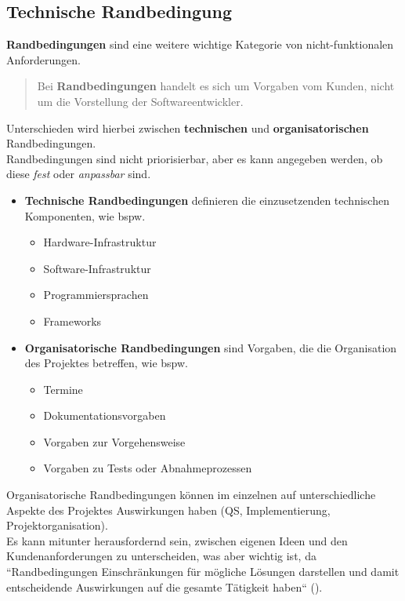\subsection{Technische Randbedingung}\label{subsec:technische-randbedingung}
\textbf{Randbedingungen} sind eine weitere wichtige Kategorie von nicht-funktionalen Anforderungen.

\vspace{2mm}
\begin{tcolorbox}
    \blockquote[{\cite[65, Hervorhebung eigene]{Wed09}}]{
        Bei \textbf{Randbedingungen} handelt es sich um Vorgaben vom Kunden, nicht um die Vorstellung der Softwareentwickler.
    }
\end{tcolorbox}
\vspace{2mm}

\noindent
Unterschieden wird hierbei zwischen \textbf{technischen} und \textbf{organisatorischen} Randbedingungen.\\

\noindent
Randbedingungen sind nicht priorisierbar, aber es kann angegeben werden, ob diese \textit{fest} oder \textit{anpassbar} sind.

\begin{itemize}
    \item \textbf{Technische Randbedingungen} definieren die einzusetzenden technischen Komponenten, wie bspw.
        \begin{itemize}
            \item Hardware-Infrastruktur
            \item Software-Infrastruktur
            \item Programmiersprachen
            \item Frameworks
        \end{itemize}
    \item \textbf{Organisatorische Randbedingungen} sind Vorgaben, die die Organisation des Projektes betreffen, wie bspw.
    \begin{itemize}
        \item Termine
        \item Dokumentationsvorgaben
        \item Vorgaben zur Vorgehensweise
        \item Vorgaben zu Tests oder Abnahmeprozessen
    \end{itemize}
\end{itemize}

\noindent
Organisatorische Randbedingungen können im einzelnen auf unterschiedliche Aspekte des Projektes Auswirkungen haben (QS, Implementierung, Projektorganisation).\\

\noindent
Es kann mitunter herausfordernd sein, zwischen eigenen Ideen und den Kundenanforderungen zu unterscheiden, was aber wichtig ist, da ``Randbedingungen Einschränkungen für mögliche Lösungen darstellen und damit entscheidende Auswirkungen auf die gesamte Tätigkeit haben`` (\cite[65]{Wed09}).